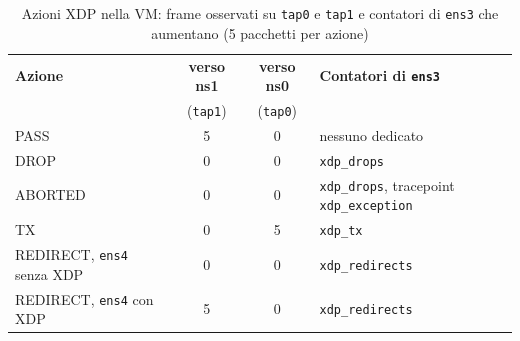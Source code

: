 \begin{table}[H]
    \centering
    \footnotesize
    \begin{tabular}{@{}lcc>{\raggedright\arraybackslash}p{5.1cm}@{}}
        \toprule
        \textbf{Azione} & \textbf{verso ns1} & \textbf{verso ns0} & \textbf{Contatori di \texttt{ens3}} \\
         & (\texttt{tap1}) & (\texttt{tap0}) & \\
        \midrule
        PASS                       & 5 & 0 & nessuno dedicato \\
        DROP                       & 0 & 0 & \texttt{xdp\_drops} \\
        ABORTED                    & 0 & 0 & \texttt{xdp\_drops}, tracepoint \texttt{xdp\_exception} \\
        TX                         & 0 & 5 & \texttt{xdp\_tx} \\
        REDIRECT, \texttt{ens4} senza XDP & 0 & 0 & \texttt{xdp\_redirects} \\
        REDIRECT, \texttt{ens4} con XDP   & 5 & 0 & \texttt{xdp\_redirects} \\
        \bottomrule
    \end{tabular}
    \caption{Azioni XDP nella VM: frame osservati su \texttt{tap0} e \texttt{tap1} e contatori di \texttt{ens3} che aumentano (5 pacchetti per azione)}
    \label{tab:azioni-xdp}
\end{table}
